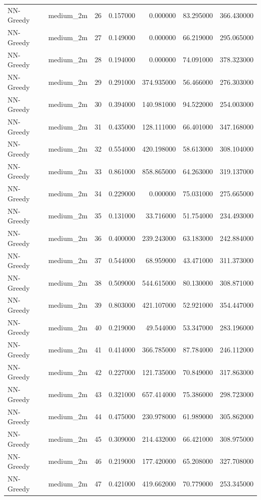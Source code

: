 \begin{tabular}{llrrrrr}
NN-Greedy & medium_2m & 26 & 0.157000 & 0.000000 & 83.295000 & 366.430000 \\
NN-Greedy & medium_2m & 27 & 0.149000 & 0.000000 & 66.219000 & 295.065000 \\
NN-Greedy & medium_2m & 28 & 0.194000 & 0.000000 & 74.091000 & 378.323000 \\
NN-Greedy & medium_2m & 29 & 0.291000 & 374.935000 & 56.466000 & 276.303000 \\
NN-Greedy & medium_2m & 30 & 0.394000 & 140.981000 & 94.522000 & 254.003000 \\
NN-Greedy & medium_2m & 31 & 0.435000 & 128.111000 & 66.401000 & 347.168000 \\
NN-Greedy & medium_2m & 32 & 0.554000 & 420.198000 & 58.613000 & 308.104000 \\
NN-Greedy & medium_2m & 33 & 0.861000 & 858.865000 & 64.263000 & 319.137000 \\
NN-Greedy & medium_2m & 34 & 0.229000 & 0.000000 & 75.031000 & 275.665000 \\
NN-Greedy & medium_2m & 35 & 0.131000 & 33.716000 & 51.754000 & 234.493000 \\
NN-Greedy & medium_2m & 36 & 0.400000 & 239.243000 & 63.183000 & 242.884000 \\
NN-Greedy & medium_2m & 37 & 0.544000 & 68.959000 & 43.471000 & 311.373000 \\
NN-Greedy & medium_2m & 38 & 0.509000 & 544.615000 & 80.130000 & 308.871000 \\
NN-Greedy & medium_2m & 39 & 0.803000 & 421.107000 & 52.921000 & 354.447000 \\
NN-Greedy & medium_2m & 40 & 0.219000 & 49.544000 & 53.347000 & 283.196000 \\
NN-Greedy & medium_2m & 41 & 0.414000 & 366.785000 & 87.784000 & 246.112000 \\
NN-Greedy & medium_2m & 42 & 0.227000 & 121.735000 & 70.849000 & 317.863000 \\
NN-Greedy & medium_2m & 43 & 0.321000 & 657.414000 & 75.386000 & 298.723000 \\
NN-Greedy & medium_2m & 44 & 0.475000 & 230.978000 & 61.989000 & 305.862000 \\
NN-Greedy & medium_2m & 45 & 0.309000 & 214.432000 & 66.421000 & 308.975000 \\
NN-Greedy & medium_2m & 46 & 0.219000 & 177.420000 & 65.208000 & 327.708000 \\
NN-Greedy & medium_2m & 47 & 0.421000 & 419.662000 & 70.779000 & 253.345000 \\

\end{tabular}
